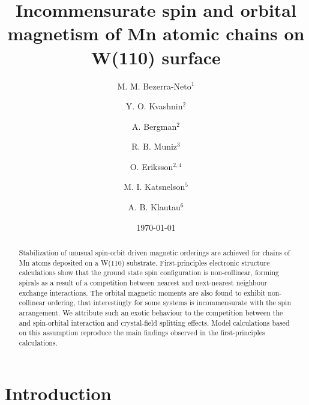 \documentclass[prl,final,twocolumn]{revtex4-1}
\begin{document}
\title{ Incommensurate spin and orbital magnetism of Mn atomic chains on W(110) surface}

\author{M. M. Bezerra-Neto$^{1}$}
\author{Y. O. Kvashnin$^{2}$}
\author{A. Bergman$^{2}$}
\author{R. B. Muniz$^{3}$}
\author{O. Eriksson$^{2,4}$}
\author{M. I. Katsnelson$^{5}$}
\author{A. B. Klautau$^{6}$}



\date{\today}

\begin{abstract}

\noindent

Stabilization of unusual spin-orbit driven magnetic orderings are achieved for chains of Mn atoms deposited on a W(110) substrate. First-principles electronic structure calculations show that the ground state spin configuration is non-collinear, forming spirals as a result of a competition between nearest and next-nearest neighbour exchange interactions. The orbital magnetic moments are also found to exhibit non-collinear ordering, that interestingly for some systems is incommensurate with the spin arrangement. We attribute such an exotic behaviour to the competition between the and spin-orbital interaction and crystal-field splitting effects. Model calculations based on this assumption reproduce the main findings observed in the first-principles calculations.


\end{abstract}

\maketitle

\section{Introduction}
 
\end{document}
